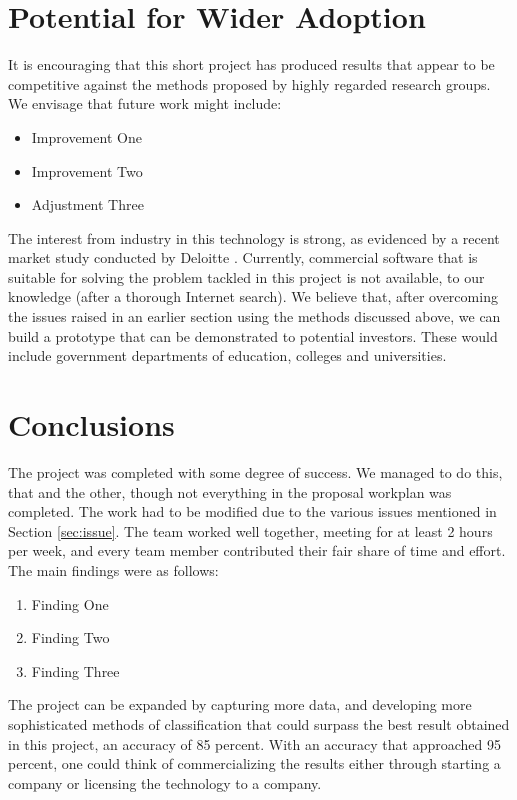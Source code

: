 \documentclass[12pt,a4paper]{article}
\begin{document}
	\section{Potential for Wider Adoption}
	It is encouraging that this short project has produced results that appear to be competitive against the methods proposed by highly regarded research groups. We envisage that future work might include:
	\begin{itemize}
		\item Improvement One
		\item Improvement Two
		\item Adjustment Three
	\end{itemize}

	The interest from industry in this technology is strong, as evidenced by a recent market study conducted by Deloitte \cite{latexcompanion}. Currently, commercial software that is suitable for solving the problem tackled in this project is not available, to our knowledge (after a thorough Internet search). We believe that, after overcoming the issues raised in an earlier section using the methods discussed above, we can build a prototype that can be demonstrated to potential investors. These would include government departments of education, colleges and universities.
	
	\section{Conclusions}
	The project was completed with some degree of success. We managed to do this, that and the other, though not everything in the proposal workplan was completed. The work had to be modified due to the various issues mentioned in Section \ref{sec:issue}. The team worked well together, meeting for at least 2 hours per week, and every team member contributed their fair share of time and effort. The main findings were as follows:
	\begin{enumerate}
		\item Finding One
		\item Finding Two
		\item Finding Three
	\end{enumerate}

	The project can be expanded by capturing more data, and developing more sophisticated methods of classification that could surpass the best result obtained in this project, an accuracy of 85 percent. With an accuracy that approached 95 percent, one could think of commercializing the results either through starting a company or licensing the technology to a company.
		
	
	
	
	
	
\end{document}
